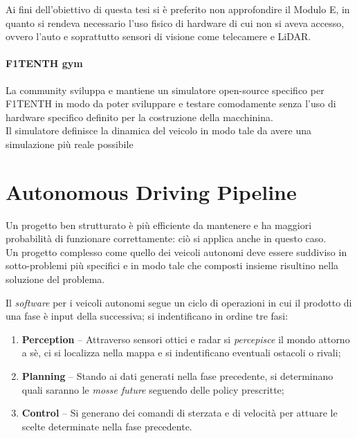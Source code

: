 \noindent Ai fini dell'obiettivo di questa tesi si è preferito non approfondire il Modulo E,
in quanto si rendeva necessario l'uso fisico di hardware di cui non si aveva accesso,
ovvero l'auto e soprattutto sensori di visione come telecamere e LiDAR.

\paragraph{F1TENTH gym}
\label{par:gym}
La community sviluppa e mantiene un simulatore open-source specifico per F1TENTH
in modo da poter sviluppare e testare comodamente
senza l'uso di hardware specifico definito per la costruzione della macchinina.\\
Il simulatore definisce la dinamica del veicolo in modo tale da avere una simulazione
più reale possibile %



\section{Autonomous Driving Pipeline}
Un progetto ben strutturato è più efficiente da mantenere e ha maggiori probabilità
di funzionare correttamente: ciò si applica anche in questo caso.\\
Un progetto complesso come quello dei veicoli autonomi deve essere suddiviso in sotto-problemi
più specifici e in modo tale che composti insieme risultino nella soluzione del problema.
\par

\noindent Il \emph{software} per i veicoli autonomi segue un ciclo di operazioni
in cui il prodotto di una fase è input della successiva; si indentificano in ordine tre fasi:
\begin{enumerate}
\item \textbf{Perception} -- Attraverso sensori ottici e radar si \emph{percepisce} il mondo attorno a sè,
	  ci si localizza nella mappa e si indentificano eventuali ostacoli o rivali;
\item \textbf{Planning} -- Stando ai dati generati nella fase precedente,
	  si determinano quali saranno le \emph{mosse future} seguendo delle policy prescritte;
\item \textbf{Control} -- Si generano dei comandi di sterzata e di velocità per attuare le scelte
	  determinate nella fase precedente.
\end{enumerate}

